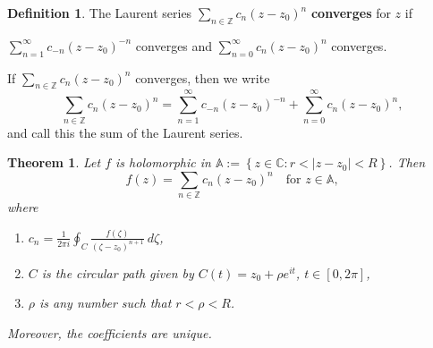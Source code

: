 \documentclass[12pt,openany]{book}
\newtheorem{theorem}{Theorem}[chapter]
\theoremstyle{definition}
\newtheorem{definition}{Definition}[chapter]
\newcommand{\set}[1]{\left\{#1\right\}}
\newcommand{\Z}{\mathbb{Z}}
\newcommand{\C}{\mathbb{C}}
\newcommand{\abs}[1]{\left\lvert #1 \right\rvert}
\begin{document}
	\begin{tcolorbox}[colback=white,colframe=defcolor,arc=5pt,title={\color{white}\bf Convergence of Laurent series}]
		\begin{definition}
			The Laurent series $\sum_{n\in\Z}c_n(z-z_0)^n$ \textbf{converges} for $z$ if \begin{center}
				$\sum_{n=1}^\infty c_{-n}(z-z_0)^{-n}$ converges and $\sum_{n=0}^\infty c_n(z-z_0)^n$ converges.
			\end{center} If $\sum_{n\in\Z}c_n(z-z_0)^n$ converges, then we write \[
			\sum_{n\in\Z}c_n(z-z_0)^n=\sum_{n=1}^\infty c_{-n}(z-z_0)^{-n}+\sum_{n=0}^\infty c_n(z-z_0)^n,
			\] and call this the sum of the Laurent series.
		\end{definition}
	\end{tcolorbox}	
	\vspace{8pt}
	\begin{tcolorbox}[colback=white,colframe=thmcolor,arc=5pt,title={\color{white}\bf }]
		\begin{theorem}
			Let $f$ is holomorphic in $\mathbb{A}:=\set{z\in\C:r<\abs{z-z_0}<R}$. Then \[
			f(z)=\sum_{n\in\Z}c_n(z-z_0)^n\quad\text{for $z\in\mathbb{A}$},
			\] where \begin{enumerate}[(1)]
				\item $\displaystyle c_n=\frac{1}{2\pi i}\oint_C\frac{f(\zeta)}{(\zeta-z_0)^{n+1}}\ d\zeta$,
				\item $C$ is the circular path given by $C(t)=z_0+\rho e^{it}$, $t\in[0,2\pi]$,
				\item $\rho$ is any number such that $r<\rho<R$.
			\end{enumerate} Moreover, the coefficients are unique.
		\end{theorem}
	\end{tcolorbox}	
\end{document}
